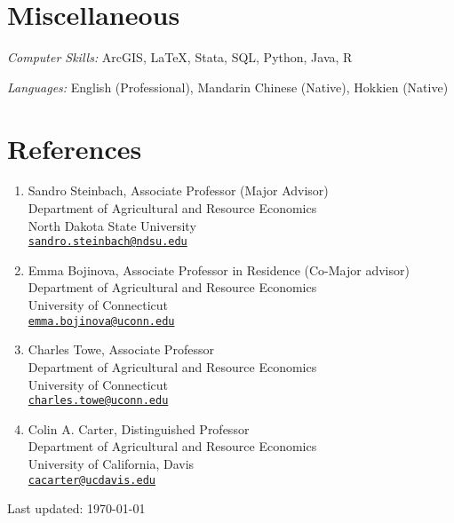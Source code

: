 \documentclass[11 pt,letterpaper]{article}
\renewenvironment{itemize}{
	\begin{list}{}{
			\setlength{\leftmargin}{1.5em}
		}
	}{
	\end{list}
}
\begin{document}
	
	
	\section*{\textbf{Miscellaneous}}
	\begin{itemize}
		\item[-] \textit{Computer Skills:} ArcGIS, \LaTeX, Stata, SQL, Python,   Java, R
		\item[-] \textit{Languages:}  English (Professional),  Mandarin Chinese (Native), Hokkien (Native)
		
	\end{itemize}
	
	
	
	
	\newpage
	
	\section*{\textbf{References}}
	
	\begin{enumerate}[leftmargin=0in]
		\item[] Sandro Steinbach, Associate Professor (Major Advisor) \\
		Department of Agricultural and Resource Economics \\
		North Dakota State University \\
				\href{mailto:sandro.steinbach@ndsu.edu}{\texttt{sandro.steinbach@ndsu.edu}}
				
		\item[] Emma Bojinova, Associate Professor in Residence (Co-Major advisor)\\
Department of Agricultural and Resource Economics \\
University of Connecticut \\
\href{mailto:emma.bojinova@uconn.edu}{\texttt{emma.bojinova@uconn.edu}}

		
 
 
 \item[] Charles Towe, Associate Professor \\
Department of Agricultural and Resource Economics \\
University of Connecticut \\
 \href{mailto:charles.towe@uconn.edu}{\texttt{charles.towe@uconn.edu}}
 
		

				\item[] Colin A. Carter, Distinguished Professor \\
		Department of Agricultural and Resource Economics \\
		University of California, Davis \\
				\href{mailto:cacarter@ucdavis.edu}{\texttt{cacarter@ucdavis.edu}}
		
		
	\end{enumerate}
\vfill
			
	\bigskip
	\bigskip 
	\begin{center}
		\begin{footnotesize}
		\raggedleft	Last updated: \today \\
		\end{footnotesize}
	\end{center}
	
\end{document}
